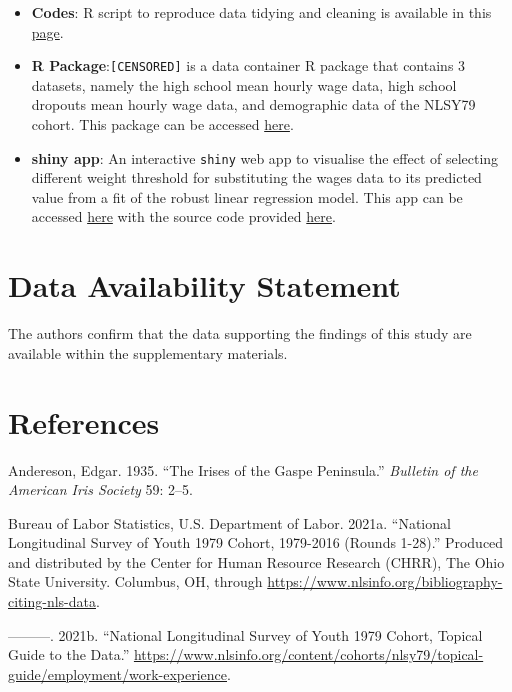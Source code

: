 \documentclass[12pt]{article}
\begin{document}
\begin{itemize}
\item
  \textbf{Codes}: R script to reproduce data tidying and cleaning is available in this \href{CENSORED/articles/process-data.html}{page}.
\item
  \textbf{R Package}:\texttt{[CENSORED]} is a data container R package that contains 3 datasets, namely the high school mean hourly wage data, high school dropouts mean hourly wage data, and demographic data of the NLSY79 cohort. This package can be accessed \href{CENSORED}{here}.
\item
  \textbf{shiny app}: An interactive \texttt{shiny} web app to visualise the effect of selecting different weight threshold for substituting the wages data to its predicted value from a fit of the robust linear regression model. This app can be accessed \href{CENSORED}{here} with the source code provided \href{CENSORED/tree/master/app}{here}.
\end{itemize}

\hypertarget{data-availability-statement}{%
\section{Data Availability Statement}\label{data-availability-statement}}

The authors confirm that the data supporting the findings of this study are available within the supplementary materials.

\hypertarget{references}{%
\section*{References}\label{references}}

\hypertarget{refs}{}
\leavevmode\hypertarget{ref-iris-data}{}%
Andereson, Edgar. 1935. ``The Irises of the Gaspe Peninsula.'' \emph{Bulletin of the American Iris Society} 59: 2--5.

\leavevmode\hypertarget{ref-nlsy79}{}%
Bureau of Labor Statistics, U.S. Department of Labor. 2021a. ``National Longitudinal Survey of Youth 1979 Cohort, 1979-2016 (Rounds 1-28).'' Produced and distributed by the Center for Human Resource Research (CHRR), The Ohio State University. Columbus, OH, through \url{https://www.nlsinfo.org/bibliography-citing-nls-data}.

\leavevmode\hypertarget{ref-nlsy79guide}{}%
---------. 2021b. ``National Longitudinal Survey of Youth 1979 Cohort, Topical Guide to the Data.'' \url{https://www.nlsinfo.org/content/cohorts/nlsy79/topical-guide/employment/work-experience}.
\end{document}
